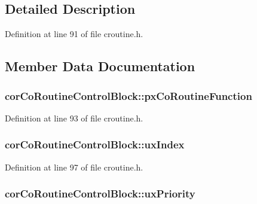 \subsection{Detailed Description}


Definition at line 91 of file croutine.\+h.



\subsection{Member Data Documentation}
\subsubsection[{\texorpdfstring{px\+Co\+Routine\+Function}{pxCoRoutineFunction}}]{ cor\+Co\+Routine\+Control\+Block\+::px\+Co\+Routine\+Function}\hypertarget{structcor_co_routine_control_block_acc98c7364cd88e8e034a5f9bba113832}{}\label{structcor_co_routine_control_block_acc98c7364cd88e8e034a5f9bba113832}


Definition at line 93 of file croutine.\+h.

\subsubsection[{\texorpdfstring{ux\+Index}{uxIndex}}]{ cor\+Co\+Routine\+Control\+Block\+::ux\+Index}\hypertarget{structcor_co_routine_control_block_a6c185cd2145f562fb570bea9b158fc81}{}\label{structcor_co_routine_control_block_a6c185cd2145f562fb570bea9b158fc81}


Definition at line 97 of file croutine.\+h.

\subsubsection[{\texorpdfstring{ux\+Priority}{uxPriority}}]{ cor\+Co\+Routine\+Control\+Block\+::ux\+Priority}\hypertarget{structcor_co_routine_control_block_a752101a5d41b5caa7fd5149436613c8f}{}\label{structcor_co_routine_control_block_a752101a5d41b5caa7fd5149436613c8f}


